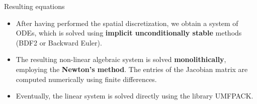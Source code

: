 \documentclass{beamer}
\begin{document}
\begin{frame}{Resulting equations}
\begin{itemize}
\item After having performed the spatial discretization, we obtain a system of 
ODEs, which is solved using \textbf{implicit unconditionally stable} methods 
(BDF2 or Backward Euler).
\vspace{0.5cm}

\item The resulting non-linear algebraic system is solved 
\textbf{monolithically}, 
employing the \textbf{Newton's method}. The entries of the Jacobian matrix are 
computed numerically using finite differences.
\vspace{0.5cm}

\item Eventually, the linear system is solved directly using the library 
UMFPACK.
\end{itemize}
\end{frame}
\end{document}
